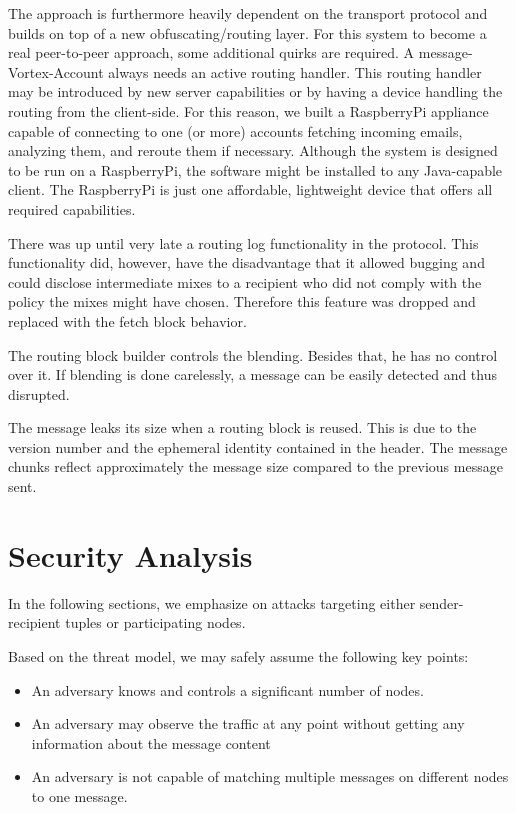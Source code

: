 The approach is furthermore heavily dependent on the transport protocol and builds on top of a new obfuscating/routing layer. For this system to become a real peer-to-peer approach, some additional quirks are required. A message-Vortex-Account always needs an active routing handler. This routing handler may be introduced by new server capabilities or by having a device handling the routing from the client-side. For this reason, we built a RaspberryPi appliance capable of connecting to one (or more) accounts fetching incoming emails, analyzing them, and reroute them if necessary. Although the system is designed to be run on a RaspberryPi, the software might be installed to any Java-capable client. The RaspberryPi is just one affordable, lightweight device that offers all required capabilities.

There was up until very late a routing log functionality in the protocol. This functionality did, however, have the disadvantage that it allowed bugging and could disclose intermediate mixes to a recipient who did not comply with the policy the mixes might have chosen. Therefore this feature was dropped and replaced with the fetch block behavior.

The routing block builder controls the blending. Besides that, he has no control over it. If blending is done carelessly, a message can be easily detected and thus disrupted.

The message leaks its size when a routing block is reused.  This is due to the version number and the ephemeral identity contained in the header. The message chunks reflect approximately the message size compared to the previous message sent.

\chapter{Security Analysis}
In the following sections, we emphasize on attacks targeting either sender-recipient tuples or participating nodes. 

Based on the threat model, we may safely assume the following key points:
\begin{itemize}
	\item An adversary knows and controls a significant number of nodes.
	\item An adversary may observe the traffic at any point without getting any information about the message content
	\item An adversary is not capable of matching multiple messages on different nodes to one message.
\end{itemize}

